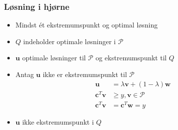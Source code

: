 \begin{frame}
\frametitle{Løsning i hjørne}
\begin{itemize}
\item Mindst ét ekstremumspunkt og optimal løsning
\item $Q$ indeholder optimale løsninger i $\mathcal{P}$
\item $\textbf{u}$ optimale løsninger til $\mathcal{P}$ og ekstremumspunkt til $Q$
\item Antag $\textbf{u}$ ikke er ekstremumspunkt til $\mathcal{P}$
%
\begin{align*}
\textbf{u} &= \lambda\textbf{v} + (1-\lambda)\textbf{w}\\
\textbf{c}^T\textbf{v} &\geq y, \textbf{v} \in \mathcal{P}\\
\textbf{c}^T\textbf{v} &= \textbf{c}^T\textbf{w} = y
\end{align*}
%
\item $\textbf{u}$ ikke ekstremumspunkt i $Q$
%
\end{itemize}
\end{frame}